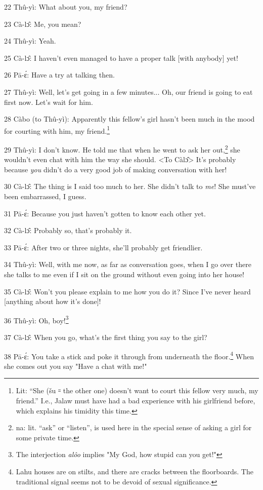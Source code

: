 22 Thû-yì: What about you, my friend?

23 Cà-lɔ̂: Me, you mean?

24 Thû-yì: Yeah.

25 Cà-lɔ̂: I haven't even managed to have a proper talk [with anybody] yet!

26 Pā-ɛ́: Have a try at talking then.

27 Thû-yì: Well, let's get going in a few minutes... Oh, our friend is going
to eat first now. Let's wait for him.

28  Càbo (to Thû-yì): Apparently this fellow's girl hasn't been much in the
mood for courting with him, my friend.\footnote{Lit: ``She (šu ꞊ the other one) doesn't want to court this fellow very much, my friend.'' I.e., Jalaw must have had a bad experience with his girlfriend before, which explains his timidity this time.}

29 Thû-yì: I don't know. He told me that when he went to ask her out,\footnote{na: lit. ``ask'' or ``listen'', is used here in the special sense of asking a girl for some private time.} she
wouldn't even chat with him the way she should. <To Càlɔ̂>
It's probably because \textit{you} didn't do a very good job of making conversation
with her!

30 Cà-lɔ̂: The thing is I said too much to her. She didn't talk to\textit{ me}!
She must've been embarrassed, I guess.

31 Pā-ɛ́: Because you just haven't gotten to know each other yet.

32 Cà-lɔ̂: Probably so, that's probably it.

33 Pā-ɛ́: After two or three nights, she'll probably get friendlier.

34 Thû-yì: Well, with me now, as far as conversation goes, when I go over there
she talks to me even if I sit on the ground without even going into her house!

35 Cà-lɔ̂: Won't you please explain to me how you do it? Since I've never heard
[anything about how it's done]!

36 Thû-yì: Oh, boy!\footnote{The interjection \textit{alôo} implies "My God, how stupid can you get!"}

37 Cà-lɔ̂: When you go, what's the first thing you say to the girl?

38 Pā-ɛ́: You take a stick and poke it through from underneath the floor.\footnote{Lahu houses are on stilts, and there are cracks between the floorboards. The traditional signal seems not to be devoid of sexual significance.}
When she comes out you say "Have a chat with me!"


